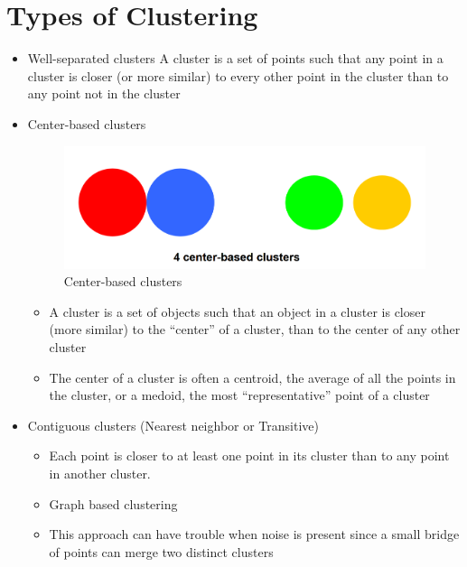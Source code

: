 \section{Types of Clustering}
\begin{itemize}
	\item Well-separated clusters
	      A cluster is a set of points such that any point in a cluster is closer (or more similar) to every other point in the cluster than to any point not in the cluster
	\item Center-based clusters
	      \begin{paracol}{2}
		      \begin{figure}[htbp]
			      \centering
			      \includegraphics{images/04/centerbased.png}
			      \caption{Center-based clusters}
			      \label{fig:04/centerbased}
		      \end{figure}
		      \switchcolumn

		      \begin{itemize}
			      \item A cluster is a set of objects such that an object in a cluster is
			            closer (more similar) to the “center” of a cluster, than to the
			            center of any other cluster
			      \item The center of a cluster is often a centroid, the average of all
			            the points in the cluster, or a medoid, the most “representative”
			            point of a cluster
		      \end{itemize}
	      \end{paracol}
	\item Contiguous clusters (Nearest neighbor or
	      Transitive)

	      \begin{paracol}{2}
		      \colfill
		      \begin{itemize}
			      \item Each point is closer to at least one point in its cluster than to
			            any point in another cluster.
			      \item Graph based clustering
			      \item This approach can have trouble when noise is present since a
			            small bridge of points can merge two distinct clusters
		      \end{itemize}


\end{paracol}
\end{itemize}
